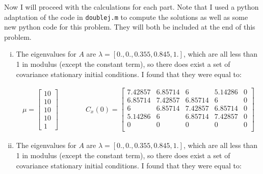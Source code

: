 \documentclass{homework}
\begin{document}
\begin{homeworkProblem}[Problem 2.4]
{\begin{enumerate}[a.]
        Now I will proceed with the calculations for each part. Note that I used a python adaptation of the code in \texttt{doublej.m} to compute the solutions as well as some new python code for this problem. They will both be included at the end of this problem.

        \begin{enumerate}[i.]

          \item The eigenvalues for $A$ are $\lambda = [ 0., 0., 0.355,  0.845, 1.]$, which are all less than 1 in modulus (except the constant term), so there does exist a set of covariance stationary initial conditions. I found that they were equal to:

            \begin{align*}
              \mu = \left[\begin{matrix} 10 \\ 10 \\ 10 \\ 10 \\ 1 \end{matrix}\right]
              \quad & \qquad
              C_x(0) = \begin{bmatrix}
                        7.42857 & 6.85714 & 6 & 5.14286 & 0\\
                        6.85714 & 7.42857 & 6.85714 & 6 & 0\\
                        6 & 6.85714 & 7.42857 & 6.85714 & 0\\
                        5.14286 & 6 & 6.85714 & 7.42857 & 0\\
                        0 & 0 & 0 & 0 & 0\\
                      \end{bmatrix}
            \end{align*}

          \item The eigenvalues for $A$ are $\lambda = [ 0., 0., 0.355,  0.845, 1.]$, which are all less than 1 in modulus (except the constant term), so there does exist a set of covariance stationary initial conditions. I found that they were equal to:


\end{enumerate}
\end{enumerate}}
\end{homeworkProblem}
\end{document}
